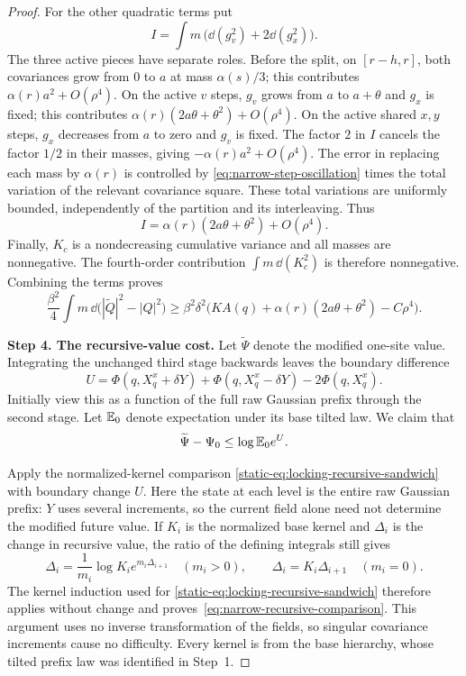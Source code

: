 \begin{proof}
For the other quadratic terms put
\[
 I=\int m\,\bigl(\dd(g_v^2)+2\dd(g_x^2)\bigr).
\]
The three active pieces have separate roles. Before the split, on
$[r-h,r]$, both covariances grow from $0$ to $a$ at mass
$\alpha(s)/3$; this contributes $\alpha(r)a^2+O(\rho^4)$.
On the active $v$ steps, $g_v$ grows from $a$ to $a+\theta$
and $g_x$ is fixed; this contributes
$\alpha(r)(2a\theta+\theta^2)+O(\rho^4)$.
On the active shared $x,y$ steps, $g_x$ decreases from $a$ to zero
and $g_v$ is fixed. The factor $2$ in $I$ cancels the factor
$1/2$ in their masses, giving $-\alpha(r)a^2+O(\rho^4)$.
The error in replacing each mass by $\alpha(r)$ is controlled by
\eqref{eq:narrow-step-oscillation} times the total variation of the
relevant covariance square. These total variations are uniformly
bounded, independently of the partition and its interleaving. Thus
\begin{equation}\label{eq:narrow-I}
 I=\alpha(r)(2a\theta+\theta^2)+O(\rho^4).
\end{equation}
Finally, $K_c$ is a nondecreasing cumulative variance and all masses
are nonnegative. The fourth-order contribution
$\int m\,\dd(K_c^2)$ is therefore nonnegative. Combining the terms
proves
\begin{equation}\label{eq:narrow-penalty}
 \frac{\beta^2}{4}\int m\,
       \dd\bigl(|\widetilde Q|^2-|Q|^2\bigr)
 \ge
 \beta^2\delta^2
 \bigl(KA(q)+\alpha(r)(2a\theta+\theta^2)-C\rho^4\bigr).
\end{equation}

\par\medskip\noindent\textbf{Step 4. The recursive-value cost.}\enspace
Let $\widetilde\Psi$ denote the modified one-site value. Integrating
the unchanged third stage backwards leaves the boundary difference
\begin{equation}\label{eq:narrow-U}
 U=\Phi(q,X_q^x+\delta Y)+\Phi(q,X_q^x-\delta Y)
                -2\Phi(q,X_q^x).
\end{equation}
Initially view this as a function of the full raw Gaussian prefix
through the second stage. Let $\mathbb E_0$ denote expectation under its
base tilted law. We claim that
\begin{equation}\label{eq:narrow-recursive-comparison}
 \widetilde\Psi-\Psi_0\le\log\mathbb E_0 e^U.
\end{equation}

Apply the normalized-kernel comparison
\eqref{static-eq:locking-recursive-sandwich} with boundary change $U$.
Here the state at each level is the entire raw Gaussian prefix: $Y$
uses several increments, so the current field alone need not determine
the modified future value. If $K_i$ is the normalized base kernel and
$\Delta_i$ is the change in recursive value, the ratio of the defining
integrals still gives
\[
 \Delta_i=\frac1{m_i}\log K_i e^{m_i\Delta_{i+1}}
 \quad(m_i>0),\qquad
 \Delta_i=K_i\Delta_{i+1}\quad(m_i=0).
\]
The kernel induction used for
\eqref{static-eq:locking-recursive-sandwich} therefore applies without
change and proves~\eqref{eq:narrow-recursive-comparison}. This argument
uses no inverse transformation of the fields, so singular covariance
increments cause no difficulty. Every kernel is from the base hierarchy,
whose tilted prefix law was identified in Step~1.


\end{proof}
